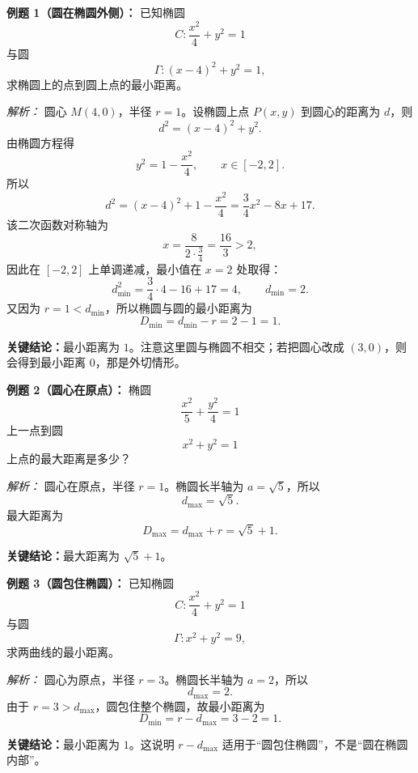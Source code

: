 \begin{examplebox}
\textbf{例题 1（圆在椭圆外侧）：}
已知椭圆
\[
C:\frac{x^2}{4}+y^2=1
\]
与圆
\[
\Gamma:(x-4)^2+y^2=1,
\]
求椭圆上的点到圆上点的最小距离。

\textit{解析：}
圆心 $M(4,0)$，半径 $r=1$。设椭圆上点 $P(x,y)$ 到圆心的距离为 $d$，则
\[
d^2=(x-4)^2+y^2.
\]
由椭圆方程得
\[
y^2=1-\frac{x^2}{4},
\qquad x\in[-2,2].
\]
所以
\[
d^2=(x-4)^2+1-\frac{x^2}{4}
=\frac34x^2-8x+17.
\]
该二次函数对称轴为
\[
x=\frac{8}{2\cdot\frac34}=\frac{16}{3}>2,
\]
因此在 $[-2,2]$ 上单调递减，最小值在 $x=2$ 处取得：
\[
d_{\min}^2=\frac34\cdot4-16+17=4,
\qquad d_{\min}=2.
\]
又因为 $r=1<d_{\min}$，所以椭圆与圆的最小距离为
\[
D_{\min}=d_{\min}-r=2-1=1.
\]

\textbf{关键结论：}最小距离为 $1$。注意这里圆与椭圆不相交；若把圆心改成 $(3,0)$，则会得到最小距离 $0$，那是外切情形。

\medskip

\textbf{例题 2（圆心在原点）：}
椭圆
\[
\frac{x^2}{5}+\frac{y^2}{4}=1
\]
上一点到圆
\[
x^2+y^2=1
\]
上点的最大距离是多少？

\textit{解析：}
圆心在原点，半径 $r=1$。椭圆长半轴为 $a=\sqrt5$，所以
\[
d_{\max}=\sqrt5.
\]
最大距离为
\[
D_{\max}=d_{\max}+r=\sqrt5+1.
\]

\textbf{关键结论：}最大距离为 $\sqrt5+1$。

\medskip

\textbf{例题 3（圆包住椭圆）：}
已知椭圆
\[
C:\frac{x^2}{4}+y^2=1
\]
与圆
\[
\Gamma:x^2+y^2=9,
\]
求两曲线的最小距离。

\textit{解析：}
圆心为原点，半径 $r=3$。椭圆长半轴为 $a=2$，所以
\[
d_{\max}=2.
\]
由于 $r=3>d_{\max}$，圆包住整个椭圆，故最小距离为
\[
D_{\min}=r-d_{\max}=3-2=1.
\]

\textbf{关键结论：}最小距离为 $1$。这说明 $r-d_{\max}$ 适用于“圆包住椭圆”，不是“圆在椭圆内部”。
\end{examplebox}
